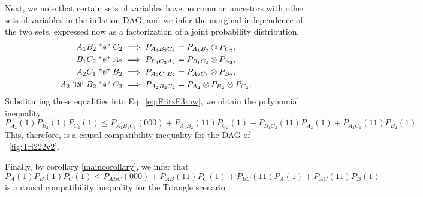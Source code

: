 Next, we note that certain sets of variables have no common ancestors with other sets of variables in the inflation DAG, and we infer the marginal independence of the two sets, expressed now as a factorization of a joint probability distribution,
\begin{align}\begin{split}\label{eq:tri222fac}
A_1 B_2 \mathrel{\mathopen{\Lsh}{\scriptstyle\emptyset}\mathclose{\Rsh}} C_2 \implies	P_{A_1 B_2 C_2} &= P_{A_1 B_2} \otimes P_{C_2}, \\
B_1 C_2 \mathrel{\mathopen{\Lsh}{\scriptstyle\emptyset}\mathclose{\Rsh}} A_2 \implies	P_{B_1 C_2 A_2} &= P_{B_1 C_2} \otimes P_{A_2}, \\
A_2 C_1 \mathrel{\mathopen{\Lsh}{\scriptstyle\emptyset}\mathclose{\Rsh}} B_2 \implies	P_{A_2 C_1 B_2} &= P_{A_2 C_1} \otimes P_{B_2}, \\
A_2 \mathrel{\mathopen{\Lsh}{\scriptstyle\emptyset}\mathclose{\Rsh}} B_2 \mathrel{\mathopen{\Lsh}{\scriptstyle\emptyset}\mathclose{\Rsh}} C_2 \implies	P_{A_2 B_2 C_2} &= P_{A_2} \otimes P_{B_2} \otimes P_{C_2} .
\end{split}\end{align}
Substituting these equalities into Eq.~\eqref{eq:FritzF3raw}, we obtain the polynomial inequality
\begin{equation}%
	P_{A_2}(1) P_{B_2}(1) P_{C_2}(1) \leq P_{A_1 B_1 C_1 }(000) + P_{A_1 B_2}(11) P_{C_2}(1) + P_{B_1 C_2}(11) P_{A_2}(1) + P_{A_2 C_1}(11) P_{B_2}(1).
\end{equation}
This, therefore, is a causal compatibility inequality for the DAG of ~\cref{fig:Tri222v2}.  

Finally, by corollary \ref{maincorollary}, we infer that 
\begin{equation}\label{eq:FritzF3}
	P_{A}(1) P_{B}(1) P_{C}(1) \leq P_{ABC}(000) + P_{AB}(11) P_C(1) + P_{BC}(11) P_A(1) + P_{AC}(11) P_B(1)
\end{equation}
is a causal compatibility inequality for the Triangle scenario.  

